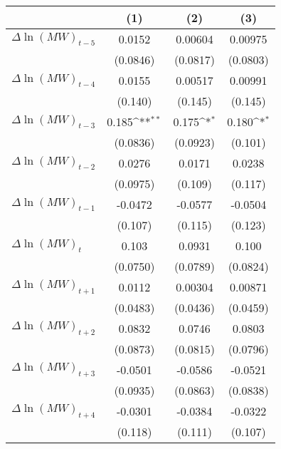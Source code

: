 {
\def\sym#1{\ifmmode^{#1}\else\(^{#1}\)\fi}
\begin{tabular}{l*{3}{c}}
\hline\hline
          &\multicolumn{1}{c}{(1)}         &\multicolumn{1}{c}{(2)}         &\multicolumn{1}{c}{(3)}         \\
\hline
$\Delta \ln(MW)_{t-5}$&   0.0152         &  0.00604         &  0.00975         \\
          & (0.0846)         & (0.0817)         & (0.0803)         \\
[1em]
$\Delta \ln(MW)_{t-4}$&   0.0155         &  0.00517         &  0.00991         \\
          &  (0.140)         &  (0.145)         &  (0.145)         \\
[1em]
$\Delta \ln(MW)_{t-3}$&    0.185\sym{**} &    0.175\sym{*}  &    0.180\sym{*}  \\
          & (0.0836)         & (0.0923)         &  (0.101)         \\
[1em]
$\Delta \ln(MW)_{t-2}$&   0.0276         &   0.0171         &   0.0238         \\
          & (0.0975)         &  (0.109)         &  (0.117)         \\
[1em]
$\Delta \ln(MW)_{t-1}$&  -0.0472         &  -0.0577         &  -0.0504         \\
          &  (0.107)         &  (0.115)         &  (0.123)         \\
[1em]
$\Delta \ln(MW)_{t}$&    0.103         &   0.0931         &    0.100         \\
          & (0.0750)         & (0.0789)         & (0.0824)         \\
[1em]
$\Delta \ln(MW)_{t+1}$&   0.0112         &  0.00304         &  0.00871         \\
          & (0.0483)         & (0.0436)         & (0.0459)         \\
[1em]
$\Delta \ln(MW)_{t+2}$&   0.0832         &   0.0746         &   0.0803         \\
          & (0.0873)         & (0.0815)         & (0.0796)         \\
[1em]
$\Delta \ln(MW)_{t+3}$&  -0.0501         &  -0.0586         &  -0.0521         \\
          & (0.0935)         & (0.0863)         & (0.0838)         \\
[1em]
$\Delta \ln(MW)_{t+4}$&  -0.0301         &  -0.0384         &  -0.0322         \\
          &  (0.118)         &  (0.111)         &  (0.107)         \\

\end{tabular}}
